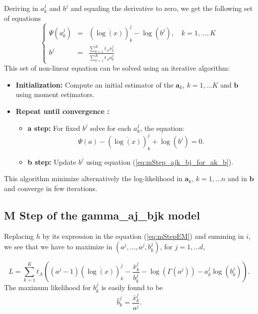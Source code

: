 \documentclass[a4paper,10pt]{article}
\newcommand{\ba}{\mathbf{a}}
\newcommand{\bb}{\mathbf{b}}
\begin{document}
Deriving in $a^j_k$ and $b^j$ and equaling the derivative to zero, we get the following set of equations
\begin{equation}\label{eq:mStep_ajk_bj_for_ak_b}
\left\lbrace
\begin{array}{lcl}
  \Psi(a^j_k) & = & (\overline{\log(x)})^j_k  - \log(b^j), \quad k=1,\ldots, K \\
  b^j         & = & \frac{\sum_{k=1}^K t_{.k} \bar{x}^j_k}{\sum_{k=1}^K t_{.k} a^j_k}
\end{array}
\right.
\end{equation}
This set of non-linear equation can be solved using an iterative algorithm:
\begin{itemize}
\item {\bf Initialization:} Compute an initial estimator of the $\ba_k$, $k=1,\ldots K$ and $\bb$
using moment estimators.
\item {\bf Repeat until convergence :}
\begin{itemize}
\item {\bf a step:} For fixed $b^j$ solve for each $a^j_k$, the equation:
\begin{equation*}
  \Psi(a) - (\overline{\log(x)})^j_k + \log(b^j) = 0.
\end{equation*}
\item {\bf b step:} Update $b^j$ using equation (\ref{eq:mStep_ajk_bj_for_ak_b}).
\end{itemize}
\end{itemize}

This algorithm minimize alternatively the log-likelihood in $\ba_k$, $k=1,\ldots n$ and in
$\bb$ and converge in few iterations.

\subsection{M Step of the gamma\_aj\_bjk model}
Replacing $h$ by its expression in the equation (\ref{eq:mStepEM}) and summing in $i$, we see that we have to maximize in
$(a^j,\ldots, a^j, b^j_k)$, for $j=1,\ldots d$,

\begin{equation}\label{eq:mStep_aj_bjk}
L =\sum_{k=1}^{K} t_{.k} \left( (a^j-1)(\overline{\log(x)})^j_k - \frac{\bar{x}^j_k}{b^j_k} - \log(\Gamma(a^j)) - a^j_k \log(b^j_k) \right).
\end{equation}
 The maximum likelihood for $b^j_k$ is
easily found to be
\begin{equation}\label{eq:mStep_aj_bjk_for_bjk}
\hat{b}^j_k = \frac{\bar{x}^j_k}{a^j}.
\end{equation}
\end{document}
